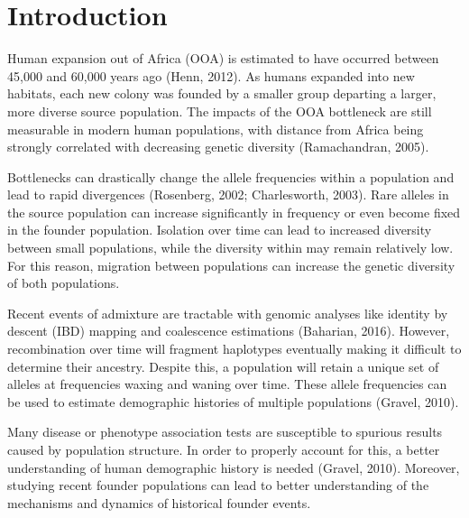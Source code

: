 \documentclass[
11pt, %
oneside, %
english, %
doublespacing, %
headsepline, %
]{MastersDoctoralThesis} %
\begin{document}

\mainmatter %
\pagestyle{thesis} %

\section{Introduction}
Human expansion out of Africa (OOA) is estimated to have occurred between 45,000 and 60,000 years ago (Henn, 2012). 
As humans expanded into new habitats, each new colony was founded by a smaller group departing a larger, more diverse source population.
The impacts of the OOA bottleneck are still measurable in modern human populations, with distance from Africa being strongly correlated with decreasing genetic diversity (Ramachandran, 2005).


Bottlenecks can drastically change the allele frequencies within a population and lead to rapid divergences (Rosenberg, 2002; Charlesworth, 2003).
Rare alleles in the source population can increase significantly in frequency or even become fixed in the founder population.
Isolation over time can lead to increased diversity between small populations, while the diversity within may remain relatively low. 
For this reason, migration between populations can increase the genetic diversity of both populations.


Recent events of admixture are tractable with genomic analyses like identity by descent (IBD) mapping and coalescence estimations (Baharian, 2016).
However, recombination over time will fragment haplotypes eventually making it difficult to determine their ancestry.
Despite this, a population will retain a unique set of alleles at frequencies waxing and waning over time.
These allele frequencies can be used to estimate demographic histories of multiple populations (Gravel, 2010). 

Many disease or phenotype association tests are susceptible to spurious results caused by population structure.
In order to properly account for this, a better understanding of human demographic history is needed (Gravel, 2010).
Moreover, studying recent founder populations can lead to better understanding of the mechanisms and dynamics of historical founder events. 

\end{document}
